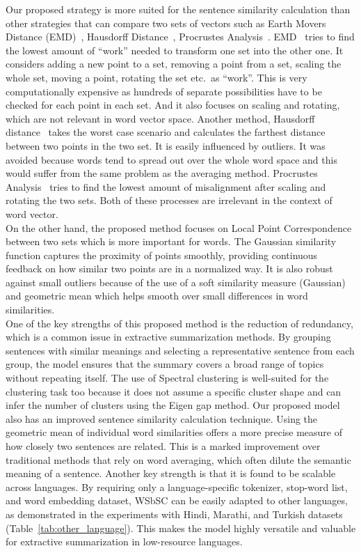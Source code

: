 Our proposed strategy is more suited for the sentence similarity calculation
than other strategies that can compare two sets of vectors
such as Earth Movers Distance (EMD)~\cite{Rubner-19998-emd},
Hausdorff Distance~\cite{hausdorff-1914-hausdorff-distance},
Procrustes Analysis~\cite{Gower-1975-procrustes-distance}.
EMD~\cite{Rubner-19998-emd} tries to find the lowest amount of ``work'' needed to transform one set into the other one.
It considers adding a new point to a set, removing a point from a set,
scaling the whole set, moving a point, rotating the set etc.\ as ``work''.
This is very computationally expensive as hundreds of separate possibilities have to be checked for each
point in each set.
And it also focuses on scaling and rotating, which are not relevant in word vector space.
Another method, Hausdorff distance~\cite{hausdorff-1914-hausdorff-distance} takes the worst case scenario
and calculates the farthest distance between two points in the two set.
It is easily influenced by outliers.
It was avoided because words tend to spread out over the whole word space and this would suffer
from the same problem as the averaging method.
Procrustes Analysis~\cite{Gower-1975-procrustes-distance} tries to find the lowest
amount of misalignment after scaling and rotating the two sets.
Both of these processes are irrelevant in the context of word vector.\\

On the other hand, the proposed method focuses on Local Point Correspondence between
two sets which is more important for words.
The Gaussian similarity function captures the proximity of points smoothly,
providing continuous feedback on how similar two points are in a normalized way.
It is also robust against small outliers because of the use of a soft similarity measure (Gaussian)
and geometric mean which helps smooth over small differences in word similarities.\\

One of the key strengths of this proposed method is the reduction of redundancy,
which is a common issue in extractive summarization methods.
By grouping sentences with similar meanings and selecting a representative
sentence from each group, the model ensures that the summary covers
a broad range of topics without repeating itself.
The use of Spectral clustering is well-suited for the clustering task too
because it does not assume a specific cluster shape
and can infer the number of clusters using the Eigen gap method.
Our proposed model also has an improved sentence similarity calculation technique.
Using the geometric mean of individual word similarities offers a more precise measure
of how closely two sentences are related.
This is a marked improvement over traditional methods that
rely on word averaging, which often dilute the semantic meaning of a sentence.
Another key strength is that it is found to be scalable across languages.
By requiring only a language-specific tokenizer, stop-word list, and word embedding dataset,
WSbSC can be easily adapted to other languages, as demonstrated in the experiments with
Hindi, Marathi, and Turkish datasets (Table~\ref{tab:other_language}).
This makes the model highly versatile and valuable for extractive summarization in low-resource languages.\\


